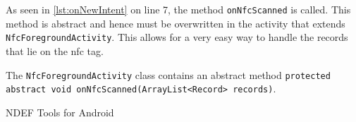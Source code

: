 As seen in \autoref{lst:onNewIntent} on line 7, the method \lstinline|onNfcScanned| is called. This method is abstract and hence must be overwritten in the activity that extends \lstinline|NfcForegroundActivity|. This allows for a very easy way to handle the records that lie on the \ac{nfc} tag.

The \lstinline|NfcForegroundActivity| class contains an abstract method \lstinline|protected abstract void onNfcScanned(ArrayList<Record> records)|. 


NDEF Tools for Android \citep{ndeftools}